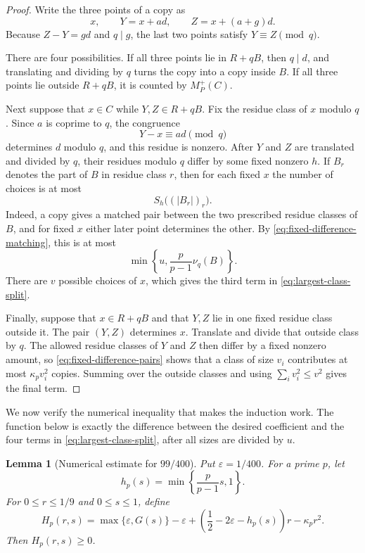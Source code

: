 \documentclass[11pt]{article}
\numberwithin{equation}{section}
\newtheorem{lemma}[lemma]{Lemma}
\theoremstyle{remark}
\begin{document}
\begin{proof}
Write the three points of a copy as
\[
 x,\qquad Y=x+ad,\qquad Z=x+(a+g)d.
\]
Because $Z-Y=gd$ and $q\mid g$, the last two points satisfy
$Y\equiv Z\pmod q$.

There are four possibilities.  If all three points lie in $R+qB$, then
$q\mid d$, and translating and dividing by $q$ turns the copy into a copy
inside $B$.  If all three points lie outside $R+qB$, it is counted by
$M_P^+(C)$.

Next suppose that $x\in C$ while $Y,Z\in R+qB$.  Fix the residue class of
$x$ modulo $q$.  Since $a$ is coprime to $q$, the congruence
\[
 Y-x\equiv ad\pmod q
\]
determines $d$ modulo $q$, and this residue is nonzero.  After $Y$ and $Z$
are translated and divided by $q$, their residues modulo $q$ differ by some
fixed nonzero $h$.  If $B_r$ denotes the part of $B$ in residue class $r$,
then for each fixed $x$ the number of choices is at most
\[
 S_h\bigl((|B_r|)_r\bigr).
\]
Indeed, a copy gives a matched pair between the two prescribed residue
classes of $B$, and for fixed $x$ either later point determines the other.  By
\eqref{eq:fixed-difference-matching}, this is at most
\[
 \min\left\{u,\frac{p}{p-1}\nu_q(B)\right\}.
\]
There are $v$ possible choices of $x$, which gives the third term in
\eqref{eq:largest-class-split}.

Finally, suppose that $x\in R+qB$ and that $Y,Z$ lie in one fixed residue
class outside it.  The pair $(Y,Z)$ determines $x$.  Translate and divide
that outside class by $q$.  The allowed residue classes of $Y$ and $Z$ then
differ by a fixed nonzero amount, so \eqref{eq:fixed-difference-pairs} shows that a
class of size $v_i$ contributes at most $\kappa_pv_i^2$ copies.  Summing
over the outside classes and using $\sum_i v_i^2\le v^2$ gives the final
term.
\end{proof}
We now verify the numerical inequality that makes the induction work.  The
function below is exactly the difference between the desired coefficient
and the four terms in \eqref{eq:largest-class-split}, after all sizes are
divided by $u$.
\begin{lemma}[Numerical estimate for $99/400$]
\label{lem:numeric-99}
Put $\varepsilon=1/400$.  For a prime $p$, let
\[
 h_p(s)=\min\left\{\frac{p}{p-1}s,1\right\}.
\]
For $0\le r\le1/9$ and $0\le s\le1$, define
\begin{equation}\label{eq:def-Hp}
 H_p(r,s)=
 \max\{\varepsilon,G(s)\}-\varepsilon
 +\left(\frac12-2\varepsilon-h_p(s)\right)r
 -\kappa_pr^2.
\end{equation}
Then $H_p(r,s)\ge0$.
\end{lemma}
\end{document}
